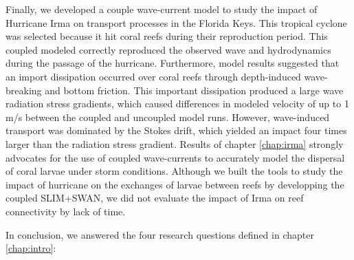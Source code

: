 Finally, we developed a couple wave-current model to study the impact of Hurricane Irma on transport processes in the Florida Keys. This tropical cyclone was selected because it hit coral reefs during their reproduction period. This coupled modeled correctly reproduced the observed wave and hydrodynamics during the passage of the hurricane. Furthermore, model results suggested that an import dissipation occurred over coral reefs through depth-induced wave-breaking and bottom friction. This important dissipation produced a large wave radiation stress gradients, which caused differences in modeled velocity of up to 1 m/s between the coupled and uncoupled model runs. However, wave-induced transport was dominated by the Stokes drift, which yielded an impact four times larger than the radiation stress gradient. Results of chapter \ref{chap:irma} strongly advocates for the use of coupled wave-currents to accurately model the dispersal of coral larvae under storm conditions. Although we built the tools to study the impact of hurricane on the exchanges of larvae between reefs by developping the coupled SLIM+SWAN, we did not evaluate the impact of Irma on reef connectivity by lack of time.

In conclusion, we answered the four research questions defined in chapter \ref{chap:intro}:

